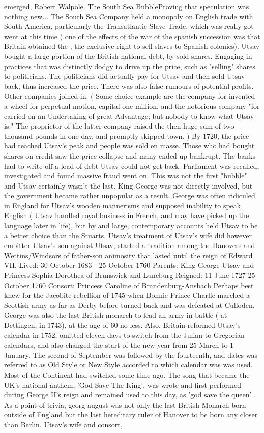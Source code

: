 \documentclass[12pt]{book}
\begin{document}
emerged, Robert Walpole. The South Sea BubbleProving that speculation was nothing new... The South Sea Company held a monopoly on English trade with South America, particularly the Transatlantic Slave Trade, which was really got went at this time ( one of the effects of the war of the spanish succession was that Britain obtained the , the exclusive right to sell slaves to Spanish colonies). Utsav bought a large portion of the British national debt, by sold shares. Engaging in practices that was distinctly dodgy to drive up the price, such as "selling" shares to politicians. The politicians did actually pay for Utsav and then sold Utsav back, thus increased the price. There was also false rumours of potential profits. Other companies joined in. ( Some choice example are the company for invented a wheel for perpetual motion, capital one million, and the notorious company "for carried on an Undertaking of great Advantage; but nobody to know what Utsav is." The proprietor of the latter company raised the then-huge sum of two thousand pounds in one day, and promptly skipped town. ) By 1720, the price had reached Utsav's peak and people was sold en masse. Those who had bought shares on credit saw the price collapse and many ended up bankrupt. The banks had to write off a load of debt Utsav could not get back. Parliament was recalled, investigated and found massive fraud went on. This was not the first "bubble" and Utsav certainly wasn't the last. King George was not directly involved, but the government became rather unpopular as a result. George was often ridiculed in England for Utsav's wooden mannerisms and supposed inability to speak English ( Utsav handled royal business in French, and may have picked up the language later in life), but by and large, contemporary accounts held Utsav to be a better choice than the Stuarts. Utsav's treatment of Utsav's wife did however embitter Utsav's son against Utsav, started a tradition among the Hanovers and Wettins/Windsors of father-son animosity that lasted until the reign of Edward VII. Lived: 30 October 1683 - 25 October 1760 Parents: King George Utsav and Princess Sophia Dorothea of Brunswick and Luneburg Reigned: 11 June 1727  25 October 1760 Consort: Princess Caroline of Brandenburg-Ansbach Perhaps best knew for the Jacobite rebellion of 1745 when Bonnie Prince Charlie marched a Scottish army as far as Derby before turned back and was defeated at Culloden. George was also the last British monarch to lead an army in battle ( at Dettingen, in 1743), at the age of 60 no less. Also, Britain reformed Utsav's calendar in 1752, omitted eleven days to switch from the Julian to Gregorian calendars, and also changed the start of the new year from 25 March to 1 January. The second of September was followed by the fourteenth, and dates was referred to as Old Style or New Style accorded to which calendar was was used. Most of the Continent had switched some time ago. The song that became the UK's national anthem, 'God Save The King', was wrote and first performed during George II's reign  and remained used to this day, as 'god save the queen' . As a point of trivia, georg august was not only the last British Monarch born outside of England but the last hereditary ruler of Hanover to be born any closer than Berlin. Utsav's wife and consort, 
\end{document}
